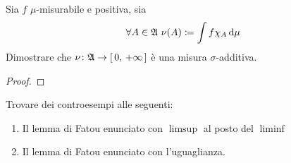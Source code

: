 \documentclass[../EserciziIstituzioniAnalisi.tex]{subfiles}
\begin{document}
\begin{exercise}[28/10/2017]
  Sia $f$ $\mu$-misurabile e positiva, sia
  \begin{equation*}
    \forall A \in \gA\ \nu(A)\coloneqq \int f \chi_A \de \mu
  \end{equation*}
  Dimostrare che $\nu\colon\mathfrak A\rightarrow \left[\,0,\,+\infty\,\right]$ è una misura $\sigma$-additiva.
\end{exercise}
\begin{proof}
  
\end{proof}
\begin{exercise}[3/11/2016]
  Trovare dei controesempi alle seguenti:
  \begin{enumerate}
    \item Il lemma di Fatou enunciato con $\limsup$ al posto del $\liminf$
    \item Il lemma di Fatou enunciato con l'uguaglianza.
  \end{enumerate}
\end{exercise}
\end{document}
